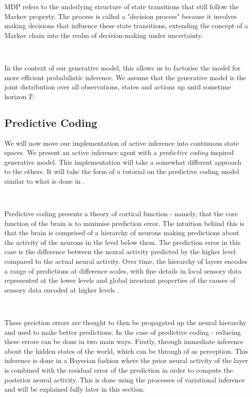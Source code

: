 \documentclass{article}
\begin{document}
MDP refers to the underlying structure of state transitions that still follow the Markov property. The process is called a "decision process" because it involves making decisions that influence these state transitions, extending the concept of a Markov chain into the realm of decision-making under uncertainty.

\

In the context of our generative model, this allows us to factorise the model for more efficient probabilistic inference. We assume that the generative model is the joint distribution over all observations, states and actions up until sometime horizon $T$:

\subsection{Predictive Coding}\label{section:predictive_coding}

We will now move our implementation of active inference into continuous state spaces. We present an active inference agent with a \textit{predictive coding} inspired generative model. This implementation will take a somewhat different approach to the others. It will take the form of a tutorial on the predictive coding model similar to what is done in \citet{bogacz2017tutorial}.

\

Predictive coding presents a theory of cortical function - namely, that the core function of the brain is to minimise prediction error. The intuition behind this is that the brain is comprised of a hierarchy of neurons making predictions about the activity of the neurons in the level below them. \citep{friston2008hierarchical} The prediction error in this case is the difference between the neural activity predicted by the higher level compared to the actual neural activity. Over time, the hierarchy of layers encodes a range of predictions at difference scales, with fine details in local sensory data represented at the lower levels and global invariant properties of the causes of sensory data encoded at higher levels \citep{millidge2021applications}. 

\

These preiction errors are thought to then be propagated up the neural hierarchy and used to make better predictions. In the case of predictive coding - reducing these errors can be done in two main ways. Firstly, through immediate inference about the hidden states of the world, which can be through of as perception. This inference is done in a Bayesian fashion where the prior neural activity of the layer is combined with the residual error of the prediction in order to compute the posterior neural activity. This is done using the processes of variational inference and will be explained fully later in this section.
\end{document}

